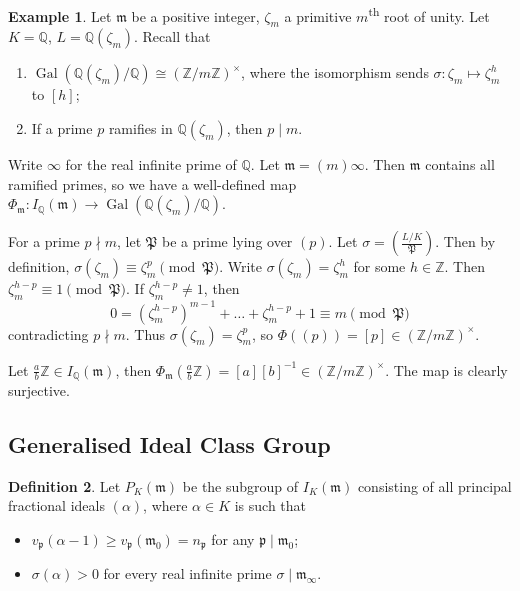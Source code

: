 \documentclass[11pt]{article}
\theoremstyle{definition}
\newtheorem{definition}{Definition}[section]
\newtheorem{example}[definition]{Example}
\theoremstyle{plain}
\theoremstyle{remark}
\DeclareMathOperator{\Gal}{Gal}
\newcommand{\ZZ}{\mathbb{Z}}
\newcommand{\QQ}{\mathbb{Q}}
\newcommand{\cp}{\mathfrak{P}}
\newcommand{\fp}{\mathfrak{p}}
\newcommand{\fm}{\mathfrak{m}}
\newcommand{\leg}[2]{\left(\frac{#1}{#2}\right)}
\begin{document}
\begin{example}\label{eg:2_11}
    Let $\fm$ be a positive integer, $\zeta_m$ a primitive $m$\textsuperscript{th} root of unity. Let $K = \QQ$, $L = \QQ(\zeta_m)$. Recall that
    \begin{enumerate}
        \item $\Gal(\QQ(\zeta_m) / \QQ) \cong (\ZZ / m \ZZ)^\times$, where the isomorphism sends $\sigma : \zeta_m \mapsto \zeta_m^h$ to $[h]$;
        \item If a prime $p$ ramifies in $\QQ(\zeta_m)$, then $p \mid m$.
    \end{enumerate}
    Write $\infty$ for the real infinite prime of $\QQ$. Let $\fm = (m) \infty$. Then $\fm$ contains all ramified primes, so we have a well-defined map $\Phi_\fm : I_\QQ(\fm) \to \Gal(\QQ(\zeta_m) / \QQ)$.

    For a prime $p \nmid m$, let $\cp$ be a prime lying over $(p)$. Let $\sigma = \leg{L/K}{\cp}$. Then by definition, $\sigma(\zeta_m) \equiv \zeta_m^p \pmod{\cp}$. Write $\sigma(\zeta_m) = \zeta_m^h$ for some $h \in \ZZ$. Then $\zeta_m^{h-p} \equiv 1 \pmod{\cp}$. If $\zeta_m^{h-p} \neq 1$, then
    \begin{equation*}
        0 = (\zeta_m^{h-p})^{m-1} + \ldots + \zeta_m^{h-p} + 1 \equiv m \pmod{\cp}
    \end{equation*}
    contradicting $p \nmid m$. Thus $\sigma(\zeta_m) = \zeta_m^p$, so $\Phi((p)) = [p] \in (\ZZ / m \ZZ)^\times$.

    Let $\frac{a}{b}\ZZ \in I_\QQ(\fm)$, then $\Phi_\fm(\frac{a}{b} \ZZ) = [a][b]^{-1} \in (\ZZ / m \ZZ)^\times$.
    The map is clearly surjective.
\end{example}

\subsection{Generalised Ideal Class Group}

\begin{definition}\label{def:2_12}
    Let $P_K(\fm)$ be the subgroup of $I_K(\fm)$ consisting of all principal fractional ideals $(\alpha)$, where $\alpha \in K$ is such that
    \begin{itemize}
        \item $v_\fp(\alpha - 1) \ge v_\fp(\fm_0) = n_\fp$ for any $\fp \mid \fm_0$;
        \item $\sigma(\alpha) > 0$ for every real infinite prime $\sigma \mid \fm_\infty$.
    \end{itemize}
\end{definition}
\end{document}
